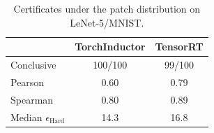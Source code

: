 \begin{table}
\centering\scriptsize
\renewcommand{\arraystretch}{0.85}

\setlength{\tabcolsep}{3pt}
\caption{Certificates under the patch distribution on LeNet-5/MNIST.}
\label{tab:patch}
\begin{tabular*}{\linewidth}{@{\extracolsep{\fill}}lcc}
\toprule
 & TorchInductor & TensorRT \\
\midrule
Conclusive & 100/100 & 99/100 \\
Pearson & 0.60 & 0.79 \\
Spearman & 0.80 & 0.89 \\
Median $\epsilon_{\mathrm{Hard}}$ & 14.3 & 16.8 \\
\bottomrule
\end{tabular*}

\end{table}
